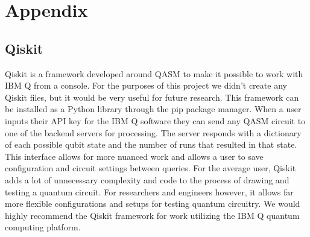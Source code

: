 \documentclass[12pt]{article}
\begin{document}
    

\newpage

\section{Appendix}
\subsection{Qiskit}
        Qiskit is a framework developed around QASM to make it possible to work with IBM Q from a console. For the purposes of this project we didn't create any Qiskit files, but it would be very useful for future research. This framework can be installed as a Python library through the pip package manager. When a user inputs their API key for the IBM Q software they can send any QASM circuit to one of the backend servers for processing. The server responds with a dictionary of each possible qubit state and the number of runs that resulted in that state. This interface allows for more nuanced work and allows a user to save configuration and circuit settings between queries. For the average user, Qiskit adds a lot of unnecessary complexity and code to the process of drawing and testing a quantum circuit. For researchers and engineers however, it allows far more flexible configurations and setups for testing quantum circuitry. We would highly recommend the Qiskit framework for work utilizing the IBM Q quantum computing platform.
\end{document}
